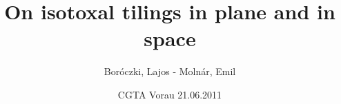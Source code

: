 \usepackage[english]{babel}
\usepackage[T1]{fontenc}
\usepackage[utf8]{inputenc}
\usepackage{graphicx}
\usepackage{listings}
\usepackage{amsmath}
\usepackage{amssymb}
\usepackage{ae,aecompl}
\usepackage{fix-cm}


\beamertemplatenavigationsymbolsempty

\title{On isotoxal tilings in plane and in space}
\author{Boróczki, Lajos - Molnár, Emil}
\date{CGTA Vorau 21.06.2011}



\begin{frame}
  \maketitle
\end{frame}

\begin{frame}
  \tableofcontents
\end{frame}
\newpage

